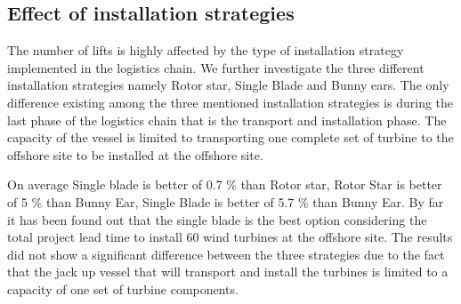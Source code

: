 \subsection{Effect of installation strategies}
The number of lifts is highly affected by the type of installation strategy implemented in the logistics chain. We further investigate the three different installation strategies namely Rotor star, Single Blade and Bunny ears. The only difference existing among the three mentioned installation strategies is during the last phase of the logistics chain that is the transport and installation phase. The capacity of the vessel is limited to transporting one complete set of turbine to the offshore site to be installed at the offshore site.

On average Single blade is better of 0.7 \% than Rotor star, Rotor Star is better of 5 \% than Bunny Ear, Single Blade is better of 5.7 \% than Bunny Ear. By far it has been found out that the single blade is the best option considering the total project lead time to install 60 wind turbines at the offshore site. The results did not show a significant difference between the three strategies due to the fact that the jack up vessel that will transport and install the turbines is limited to a capacity of one set of turbine components. 